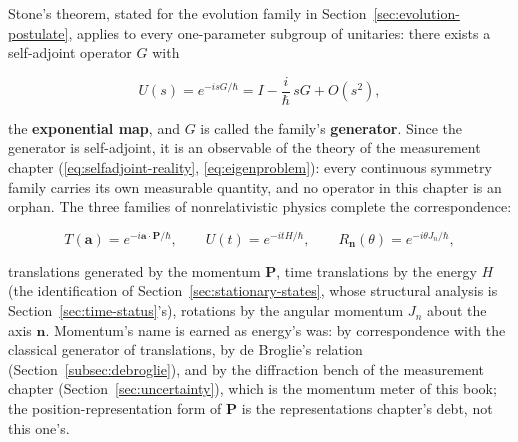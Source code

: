 Stone's theorem, stated for the evolution family in Section~\ref{sec:evolution-postulate}, applies to every one-parameter subgroup of unitaries: there exists a self-adjoint operator $G$ with
\begin{linenomath}
    \begin{equation}
        U(s) = e^{-isG/\hbar}
        = I - \frac{i}{\hbar}\,sG + O(s^2),
        \label{eq:infinitesimal-generator}
    \end{equation}
\end{linenomath}
the \textbf{exponential map}, and $G$ is called the family's \textbf{generator}. Since the generator is self-adjoint, it is an observable of the theory of the measurement chapter (\eqref{eq:selfadjoint-reality}, \eqref{eq:eigenproblem}): every continuous symmetry family carries its own measurable quantity, and no operator in this chapter is an orphan. The three families of nonrelativistic physics complete the correspondence:
\begin{linenomath}
    \begin{equation}
        T(\bm a) = e^{-i\bm a\cdot\bm P/\hbar},
        \qquad
        U(t) = e^{-itH/\hbar},
        \qquad
        R_{\bm n}(\theta) = e^{-i\theta J_n/\hbar},
        \label{eq:generator-correspondence}
    \end{equation}
\end{linenomath}
translations generated by the momentum $\bm P$, time translations by the energy $H$ (the identification of Section~\ref{sec:stationary-states}, whose structural analysis is Section~\ref{sec:time-status}'s), rotations by the angular momentum $J_n$ about the axis $\bm n$. Momentum's name is earned as energy's was: by correspondence with the classical generator of translations, by de Broglie's relation (Section~\ref{subsec:debroglie}), and by the diffraction bench of the measurement chapter (Section~\ref{sec:uncertainty}), which is the momentum meter of this book; the position-representation form of $\bm P$ is the representations chapter's debt, not this one's.

